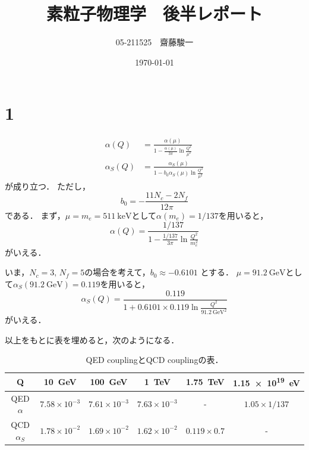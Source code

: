 \documentclass[a4paper,11pt]{jsarticle}
\begin{document}
\title{素粒子物理学　後半レポート}
\author{05-211525　齋藤駿一}
\date{\today}
\maketitle

\section*{1}

\begin{align}
  \alpha(Q) &= \frac{\alpha(\mu)}{1-\frac{\alpha(\mu)}{3\pi}\ln{\frac{Q^2}{\mu^2}}} \\
  \alpha_S(Q) &= \frac{\alpha_S(\mu)}{1-b_0\alpha_S(\mu)\ln{\frac{Q^2}{\mu^2}}} 
\end{align}
が成り立つ．
ただし，
\begin{equation}
  b_0 = - \frac{11N_c - 2N_f}{12\pi}
\end{equation}
である．
まず，$\mu=m_e=\SI{511}{\keV}$として$\alpha(m_e)=1/137$を用いると，
\begin{equation}
  \alpha(Q) = \frac{1/137}{1-\frac{1/137}{3\pi}\ln{\frac{Q^2}{m_e^2}}}
\end{equation}
がいえる．

いま，$N_c=3,\,N_f=5$の場合を考えて，$b_0\approx -0.6101$
とする．
$\mu=\SI{91.2}{\GeV}$として$\alpha_S(\SI{91.2}{\GeV})=0.119$を用いると，
\begin{equation}
  \alpha_S(Q) = \frac{0.119}{1+0.6101\times0.119\ln{\frac{Q^2}{\SI{91.2}{\GeV}^2}}}
\end{equation}
がいえる．

以上をもとに表を埋めると，次のようになる．

\begin{table}[htbp]
  \centering
  \caption{QED couplingとQCD couplingの表．}
  \label{tab:couplconst}
  \begin{tabular}{c|c|c|c|c|c}
    \hline
    Q & \SI{10}{\GeV} & \SI{100}{\GeV} & \SI{1}{\TeV} & \SI{1.75}{\TeV} & \SI{1.15e19}{\eV} \\
    \hline\hline
    QED $\alpha$ & $7.58\times 10^{-3}$ & $7.61\times 10^{-3}$ & $7.63\times 10^{-3}$ & - & $1.05\times 1/137$\\
    \hline
    QCD $\alpha_S$ & $1.78\times10^{-2}$ & $1.69\times 10^{-2}$ & $1.62\times10^{-2}$ & $0.119\times 0.7$ & - \\
    \hline
  \end{tabular}
\end{table}
\end{document}

